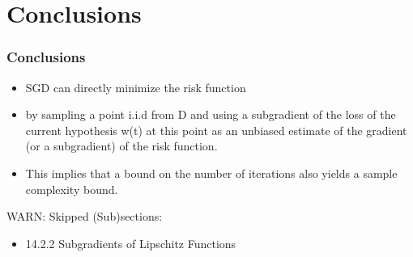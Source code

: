 \section{Conclusions}

\begin{frame}
\frametitle{Conclusions}

\begin{itemize}
    \item SGD can directly minimize the risk function
    \item by sampling a point i.i.d from D and using a subgradient of the loss of the
        current hypothesis w(t) at this point as an unbiased estimate of the gradient (or
        a subgradient) of the risk function.
    \item This implies that a bound on the number of iterations also yields a sample complexity bound.
\end{itemize}

WARN: Skipped (Sub)sections:\\
\begin{itemize}
    \item 14.2.2 Subgradients of Lipschitz Functions

\end{itemize}

\end{frame}

